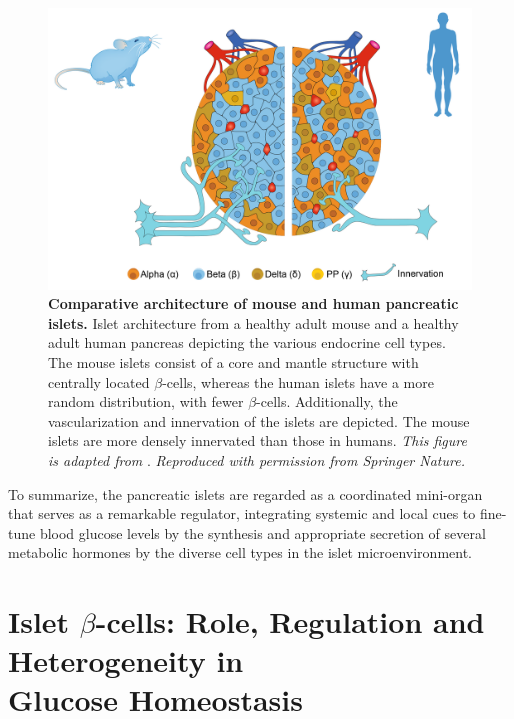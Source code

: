 \begin{figure}[t]
    \centering
    \includegraphics[width=12cm]{Chapter1/Fig/F1-2-1-01.png}
    \caption[Comparative architecture of mouse and human pancreatic islets]{\textbf{Comparative architecture of mouse and human pancreatic islets.} Islet architecture from a healthy adult mouse and a healthy adult human pancreas depicting the various endocrine cell types. The mouse islets consist of a core and mantle structure with centrally located $\beta$-cells, whereas the human islets have a more random distribution, with fewer $\beta$-cells. Additionally, the vascularization and innervation of the islets are depicted. The mouse islets are more densely innervated than those in humans. \textit{This figure is adapted from }\textbf{\cite{jain_targeting_2022,noguchi_integrating_2019}}. \textit{Reproduced with permission from Springer Nature.}}
    \label{fig:chp1_mouse_human_islets}
\end{figure}

\par To summarize, the pancreatic islets are regarded as a coordinated mini-organ that serves as a remarkable regulator, integrating systemic and local cues to fine-tune blood glucose levels by the synthesis and appropriate secretion of several metabolic hormones by the diverse cell types in the islet microenvironment.


\clearpage



\section[Islet $\beta$-cells: Role, Regulation and Heterogeneity in Glucose Homeostasis]{Islet $\beta$-cells: Role, Regulation and Heterogeneity in\\Glucose Homeostasis}  %
\label{sec:int_islet-betacells}  


